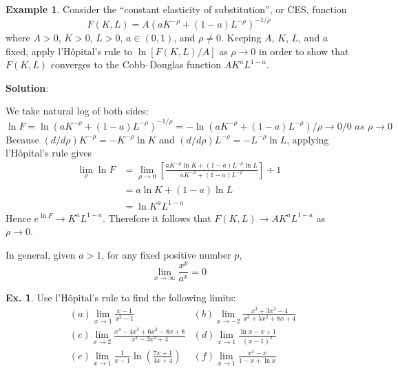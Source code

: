\documentclass[10pt,a4paper]{book}
\theoremstyle{definition}\newtheorem{definition}{Definition}
\theoremstyle{definition}\newtheorem{fact}{Fact}
\theoremstyle{definition}\newtheorem{ex}{Ex.}
\theoremstyle{definition}\newtheorem{project}{Project}
\theoremstyle{definition}\newtheorem{problem}{Problem}
\theoremstyle{definition}\newtheorem{example}{Example}
\numberwithin{theorem}{chapter}
\numberwithin{corollary}{chapter}
\numberwithin{assumption}{chapter}
\numberwithin{definition}{chapter}
\numberwithin{prop}{chapter}
\numberwithin{notation}{chapter}
\numberwithin{problem}{chapter}
\numberwithin{example}{chapter}
\numberwithin{fact}{chapter}
\numberwithin{ex}{chapter}
\begin{document}
	\begin{example}
		Consider the “constant elasticity of substitution”, or CES, function
		$$F(K,L)=A(aK^{-\rho}+(1-a)L^{-\rho})^{-1/\rho}$$
		where $A > 0$, $K > 0$, $L > 0$, $a \in (0, 1)$, and $\rho \neq 0$. Keeping $A$, $K$, $L$, and $a$ fixed, apply l’Hôpital’s rule to $\ln[ F(K, L)/A]$ as $\rho \rightarrow 0$ in order to show that $F(K, L)$ converges to the Cobb–Douglas function $AK^aL^{1-a}$.
		
		\textbf{Solution}:
		
		We take natural log of both sides:
		$$\ln F = \ln (aK^{-\rho}+(1-a)L^{-\rho})^{-1/\rho} = -\ln (aK^{-\rho} + (1-a)L^{-\rho})/ \rho \rightarrow 0/0 \,\,as\,\,\rho \rightarrow 0$$
		Because $(d/d\rho) K^{-\rho}=-K^{-\rho}\ln K$ and $(d/d\rho) L^{-\rho}=-L^{-\rho}\ln L$, applying l'Hôpital's rule gives
		\begin{align*}
			\lim_{\rho} \ln F & = \lim_{\rho \rightarrow 0} \left[ \frac{aK^{-\rho}\ln K + (1-a)L^{-\rho}\ln L}{aK^{-\rho}+(1-a)L^{-\rho}}\right ] \div 1 \\
			& = a \ln K + (1-a)\ln L                                                                                                    \\
			& = \ln K^a L^{1-a}                                                                                                         
		\end{align*}
		Hence $e^{\ln F} \rightarrow K^aL^{1-a}$. Therefore it follows that $F(K, L) \rightarrow AK^aL^{1-a}$ as $\rho \rightarrow 0$.
	\end{example}
	
	In general, given $a > 1$, for any fixed positive number $p$,
	$$\lim_{x \rightarrow \infty} \frac{x^p}{a^x} = 0$$
	
	\begin{ex}
		Use l'Hôpital's rule to find the following limits:
		\begin{align*}
			& (a) \lim_{x \rightarrow 1}\frac{x-1}{x^2-1}                                 
			& (b) \lim_{x \rightarrow -2}\frac{x^3+3x^2-4}{x^3+5x^2+8x+4}                 \\
			& (c) \lim_{x \rightarrow 2}\frac{x^4-4x^3+6x^2-8x+8}{x^3-3x^2+4}             
			& (d) \lim_{x \rightarrow 1}\frac{\ln x - x +1}{(x-1)^2}                      \\
			& (e) \lim_{x \rightarrow 1}\frac{1}{x-1}\ln \left( \frac{7x+1}{4x+4} \right) 
			& (f) \lim_{x \rightarrow 1}\frac{x^x-x}{1-x+\ln x}                           \\
		\end{align*}
	\end{ex}
	
\end{document}
